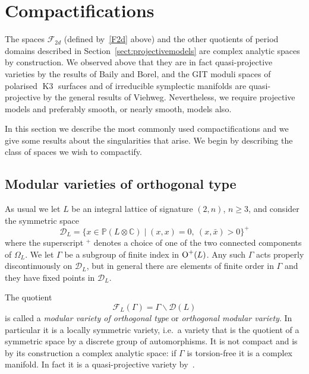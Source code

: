 \documentclass[a4paper,11pt]{article}
\newcommand{\CC}{\mathbb C}
\newcommand{\PP}{\mathbb P}
\renewcommand{\cD}{\mathcal D}
\newcommand{\cF}{\mathcal F}
\newcommand{\tensor}{\otimes}
\newcommand{\Orth}{\mathop{\null\mathrm {O}}\nolimits}
\newcommand{\Kthree}{\mathop{\mathrm {K3}}\nolimits}
\begin{document}
\section{Compactifications}\label{sect:compactifications}

The spaces $\cF_{2d}$ (defined by~\eqref{F2d} above) and the other
quotients of period domains described in
Section~\ref{sect:projectivemodels} are complex analytic spaces by
construction. We observed above that they are in fact quasi-projective
varieties by the results of Baily and Borel, and the GIT moduli spaces
of polarised $\Kthree$ surfaces and of irreducible symplectic
manifolds are quasi-projective by the general results of Viehweg.
Nevertheless, we require projective models and preferably smooth, or
nearly smooth, models also.

In this section we describe the most commonly used compactifications
and we give some results about the singularities that arise. We begin
by describing the class of spaces we wish to compactify.

\subsection {Modular varieties of orthogonal
  type}\label{subsect:orthogonaltype}

As usual we let $L$ be an integral lattice of signature $(2,n)$,
$n\ge 3$, and consider the symmetric space
\begin{equation}\label{symmdomain}
\cD_L=\{ x\in \PP(L\tensor \CC)\mid (x,x)=0,\ (x,\bar x)>0\}^+
\end{equation}
where the superscript ${}^+$ denotes a choice of one of the two
connected components of $\Omega_L$. We let $\Gamma$ be a subgroup of
finite index in $\Orth^+(L)$. Any such $\Gamma$ acts properly
discontinuously on $\cD_L$, but in general there are elements of
finite order in $\Gamma$ and they have fixed points in $\cD_L$.

The quotient
\begin{equation}\label{definemodularvariety}
\cF_L(\Gamma)=\Gamma\backslash \cD(L)
\end{equation}
is called a \emph{modular variety of orthogonal type} or
\emph{orthogonal modular variety}. In particular
it is a locally symmetric variety, i.e.\ a variety that is the
quotient of a symmetric space by a discrete group of automorphisms. It
is not compact and is by its construction a complex analytic space: if
$\Gamma$ is torsion-free it is a complex manifold. In fact it is a
quasi-projective variety by~\cite{BB}.
\end{document}
